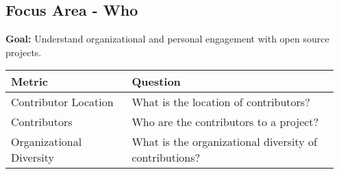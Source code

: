 
\subsection{Focus Area - Who}
\textbf{Goal:} Understand organizational and personal engagement with open source projects.
\begin{table}[ht!]
    \centering
    \begin{tabular}{|p{0.35\linewidth} | p{0.6\linewidth}|}
        \hline
        \hfil \textbf{Metric}  & \hfil \textbf{Question} \\
        \hline
		Contributor Location & What is the location of contributors? \\ 
		\hline
		Contributors & Who are the contributors to a project? \\ 
		\hline
		Organizational Diversity & What is the organizational diversity of contributions? \\ 
		\hline
    \end{tabular}
\end{table}

 
 
 

